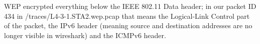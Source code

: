 WEP encrypted everything below the IEEE 802.11 Data header; in our packet ID 434 in /traces/L4-3-1.STA2.wep.pcap that means the Logical-Link Control part of the packet,
the IPv6 header (meaning source and destination addresses are no longer visible in wireshark) and the ICMPv6 header.
